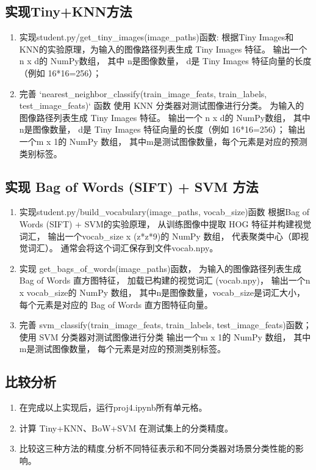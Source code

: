 \subsection{实现Tiny+KNN方法}
	\begin{enumerate}
		\item 实现student.py/get_tiny_images(image_paths)函数: 
		根据Tiny Images和KNN的实验原理，为输入的图像路径列表生成 Tiny Images 特征。
		输出一个 n x d的 NumPy数组，
		其中 n是图像数量，
		d是 Tiny Images 特征向量的长度（例如 16*16=256）；

		\item 完善 `nearest_neighbor_classify(train_image_feats, train_labels, test_image_feats)` 函数
		使用 KNN 分类器对测试图像进行分类。
		为输入的图像路径列表生成 Tiny Images 特征。
		输出一个 n x d的 NumPy数组，
		其中 n是图像数量，
		d是 Tiny Images 特征向量的长度（例如 16*16=256）；
		输出一个m x 1的 NumPy 数组，
		其中m是测试图像数量，每个元素是对应的预测类别标签。

	\end{enumerate}


\subsection{实现 Bag of Words (SIFT) + SVM 方法}
	\begin{enumerate}
		\item 实现student.py/build_vocabulary(image_paths, vocab_size)函数
		根据Bag of Words (SIFT) + SVM的实验原理，
		从训练图像中提取 HOG 特征并构建视觉词汇，
		输出一个vocab_size x (z*z*9)的 NumPy 数组，
		代表聚类中心（即视觉词汇）。
		通常会将这个词汇保存到文件vocab.npy。

		\item 实现 get_bags_of_words(image_paths)函数，
		为输入的图像路径列表生成 Bag of Words 直方图特征，
		加载已构建的视觉词汇 (vocab.npy)，
		输出一个n x vocab_size的 NumPy 数组，
		其中n是图像数量，vocab_size是词汇大小，
		每个元素是对应的 Bag of Words 直方图特征向量。

		\item 完善 svm_classify(train_image_feats, train_labels, test_image_feats)函数；
		使用 SVM 分类器对测试图像进行分类
		输出一个m x 1的 NumPy 数组，
		其中m是测试图像数量，
		每个元素是对应的预测类别标签。
	\end{enumerate}
\subsection{比较分析}
	\begin{enumerate}
		\item 在完成以上实现后，运行proj4.ipynb所有单元格。
		\item 计算 Tiny+KNN、BoW+SVM 在测试集上的分类精度。
		\item 比较这三种方法的精度,分析不同特征表示和不同分类器对场景分类性能的影响。
	\end{enumerate}
    